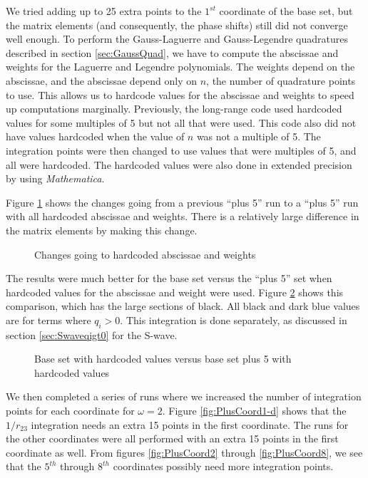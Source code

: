 \documentclass[Dissertation.tex]{subfiles}
\begin{document}
We tried adding up to 25 extra points to the $1^{st}$ coordinate of the base set, but the matrix elements (and consequently, the phase shifts) still did not converge well enough. To perform the Gauss-Laguerre and Gauss-Legendre quadratures described in section \ref{sec:GaussQuad}, we have to compute the abscissae and weights for the Laguerre and Legendre polynomials. The weights depend on the abscissae, and the abscissae depend only on $n$, the number of quadrature points to use. This allows us to hardcode values for the abscissae and weights to speed up computations marginally. Previously, the long-range code used hardcoded values for some multiples of 5 but not all that were used. This code also did not have values hardcoded when the value of $n$ was not a multiple of 5. The integration points were then changed to use values that were multiples of 5, and all were hardcoded. The hardcoded values were also done in extended precision by using \emph{Mathematica}.

Figure \ref{fig:Base5vsBase5hardcoderound} shows the changes going from a previous ``plus 5'' run to a ``plus 5'' run with all hardcoded abscissae and weights. There is a relatively large difference in the matrix elements by making this change.
\begin{figure}[H]
	\centering
	\caption{Changes going to hardcoded abscissae and weights}
	\label{fig:Base5vsBase5hardcoderound}
\end{figure}

The results were much better for the base set versus the ``plus 5'' set when hardcoded values for the abscissae and weight were used. Figure \ref{fig:BasehardcodevsBase5hardcode} shows this comparison, which has the large sections of black. All black and dark blue values are for terms where $q_i > 0$. This integration is done separately, as discussed in section \ref{sec:Swaveqigt0} for the S-wave.
\begin{figure}[H]
	\centering
	\caption[Base set with hardcoded values vs. base set plus 5 with hardcoded values]{Base set with hardcoded values versus base set plus 5 with hardcoded values}
	\label{fig:BasehardcodevsBase5hardcode}
\end{figure}

We then completed a series of runs where we increased the number of integration points for each coordinate for $\omega = 2$. Figure \ref{fig:PlusCoord1-d} shows that the $1/r_{23}$ integration needs an extra 15 points in the first coordinate. The runs for the other coordinates were all performed with an extra 15 points in the first coordinate as well. From figures \ref{fig:PlusCoord2} through \ref{fig:PlusCoord8}, we see that the $5^{th}$ through $8^{th}$ coordinates possibly need more integration points.
\end{document}
